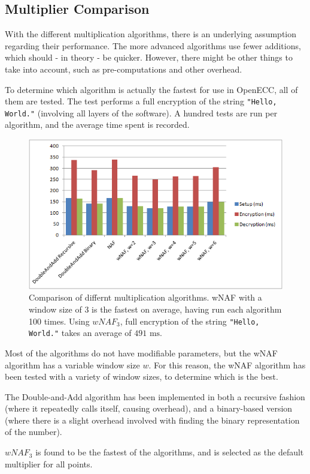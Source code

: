 \subsection{Multiplier Comparison}

With the different multiplication algorithms, there is an underlying assumption regarding their performance. The more
advanced algorithms use fewer additions, which should - in theory - be quicker. However, there might be other things
to take into account, such as pre-computations and other overhead.

To determine which algorithm is actually the fastest for use in OpenECC, all of them are tested. The test performs a
full  encryption of the string \verb+"Hello, World."+ (involving all layers of the software). A hundred tests are run
per algorithm, and the average time spent is recorded.

\begin{figure}[htb!]
	\centering
	\includegraphics[width=\textwidth]{performance/multipliers-comparison}
	\caption{Comparison of differnt multiplication algorithms. wNAF with a window size of 3 is the fastest on average,
		having run each algorithm 100 times. Using \(wNAF_3\), full encryption of the string \texttt{"Hello, World."}
		takes an average of \(491 \text{ ms}\).}
	\label{fig:multipliers-comparison}
\end{figure}

Most of the algorithms do not have modifiable parameters, but the wNAF algorithm has a variable window size \(w\). For
this reason, the wNAF algorithm has been tested with a variety of window sizes, to determine which is the best.

The Double-and-Add algorithm has been implemented in both a recursive fashion (where it repeatedly calls itself, causing
overhead), and a binary-based version (where there is a slight overhead involved with finding the binary representation
of the number).

\(wNAF_3\) is found to be the fastest of the algorithms, and is selected as the default multiplier for all points.